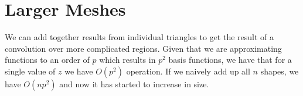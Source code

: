 \documentclass{article}
\begin{document}
\section{Larger Meshes}
We can add together results from individual triangles to get the result of a convolution over more complicated regions.
Given that we are approximating functions to an order of $p$ which results in $p^2$ basis functions, we have that for a single value of $z$ we have $O(p^2)$ operation.
If we naively add up all $n$ shapes, we have $O(np^2)$ and now it has started to increase in size.


\end{document}
